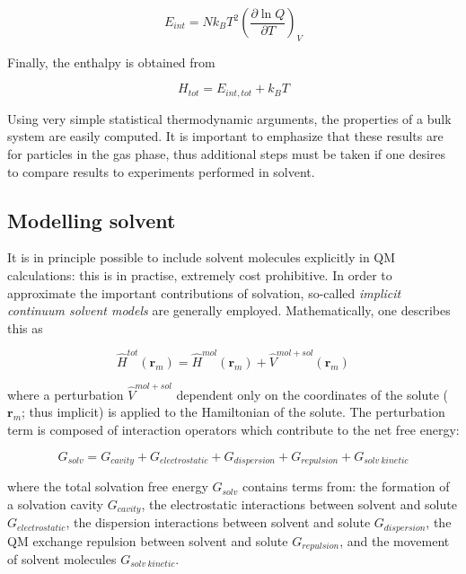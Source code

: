 \begin{equation}
  E_{int} = Nk_B T^2\left( \frac{\partial \ln Q}{\partial T} \right)_V
\end{equation}

\noindent Finally, the enthalpy is obtained from

\begin{equation}
  H_{tot} = E_{int,tot} + k_B T
\end{equation}

Using very simple statistical thermodynamic arguments, the properties of a bulk system are easily computed. It is important to emphasize that these results are for particles in the gas phase, thus additional steps must be taken if one desires to compare results to experiments performed in solvent.

\subsection{Modelling solvent}

It is in principle possible to include solvent molecules explicitly in QM calculations: this is in practise, extremely cost prohibitive. In order to approximate the important contributions of solvation, so-called \emph{implicit continuum solvent models} are generally employed.\cite{Mennucci2007,Cramer2004} Mathematically, one describes this as

\begin{equation}
  \hat{H}^{tot}(\mathbf{r}_m) = \hat{H}^{mol}(\mathbf{r}_m) + \hat{V}^{mol+sol}(\mathbf{r}_m)
\end{equation}

\noindent where a perturbation $\hat{V}^{mol+sol}$ dependent only on the coordinates of the solute ($\mathbf{r}_m$; thus implicit) is applied to the Hamiltonian of the solute. The perturbation term is composed of interaction operators which contribute to the net free energy:

\begin{equation}
G_{solv} = G_{cavity} + G_{electrostatic} + G_{dispersion} + G_{repulsion} +
G_{solv~kinetic}
\end{equation}

\noindent where the total solvation free energy $G_{solv}$ contains terms from: the formation of a solvation cavity $G_{cavity}$, the electrostatic interactions between solvent and solute $G_{electrostatic}$, the dispersion interactions between solvent and solute $G_{dispersion}$, the QM exchange repulsion between solvent and solute $G_{repulsion}$, and the movement of solvent molecules $G_{solv~kinetic}$.

